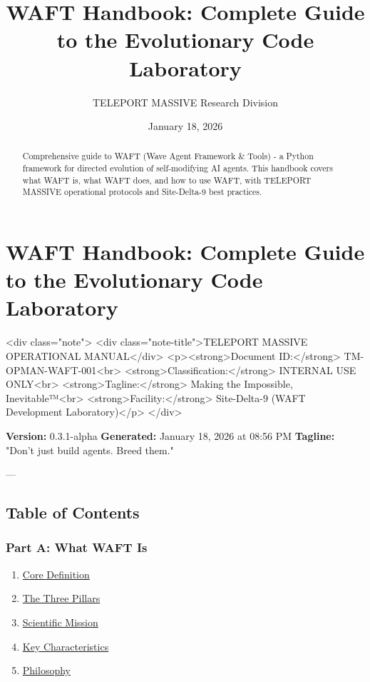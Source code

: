 \documentclass{article}
\title{WAFT Handbook: Complete Guide to the Evolutionary Code Laboratory}
\author{TELEPORT MASSIVE Research Division}
\date{January 18, 2026}
\begin{document}
\maketitle

\begin{abstract}
Comprehensive guide to WAFT (Wave Agent Framework & Tools) - a Python framework for directed evolution of self-modifying AI agents. This handbook covers what WAFT is, what WAFT does, and how to use WAFT, with TELEPORT MASSIVE operational protocols and Site-Delta-9 best practices.
\end{abstract}


\section{WAFT Handbook: Complete Guide to the Evolutionary Code Laboratory}

<div class="note">
    <div class="note-title">TELEPORT MASSIVE OPERATIONAL MANUAL</div>
    <p><strong>Document ID:</strong> TM-OPMAN-WAFT-001<br>
    <strong>Classification:</strong> INTERNAL USE ONLY<br>
    <strong>Tagline:</strong> Making the Impossible, Inevitable™<br>
    <strong>Facility:</strong> Site-Delta-9 (WAFT Development Laboratory)</p>
</div>

\textbf{Version:} 0.3.1-alpha  
\textbf{Generated:} January 18, 2026 at 08:56 PM  
\textbf{Tagline:} "Don't just build agents. Breed them."

---

\subsection{Table of Contents}

\subsubsection{Part A: What WAFT Is}
\begin{enumerate}
\item \href{#core-definition}{Core Definition}
\item \href{#the-three-pillars}{The Three Pillars}
\item \href{#scientific-mission}{Scientific Mission}
\item \href{#key-characteristics}{Key Characteristics}
\item \href{#philosophy}{Philosophy}
\end{enumerate}
\end{document}
